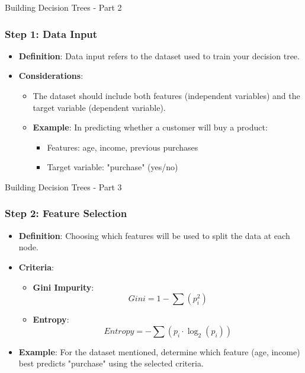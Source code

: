 \documentclass[aspectratio=169]{beamer}
\begin{document}
\begin{frame}[fragile]{Building Decision Trees - Part 2}
    \frametitle{Step 1: Data Input}
    \begin{itemize}
        \item \textbf{Definition}: Data input refers to the dataset used to train your decision tree.
        \item \textbf{Considerations}:
        \begin{itemize}
            \item The dataset should include both features (independent variables) and the target variable (dependent variable).
            \item \textbf{Example}: In predicting whether a customer will buy a product:
            \begin{itemize}
                \item Features: age, income, previous purchases
                \item Target variable: "purchase" (yes/no)
            \end{itemize}
        \end{itemize}
    \end{itemize}
\end{frame}

\begin{frame}[fragile]{Building Decision Trees - Part 3}
    \frametitle{Step 2: Feature Selection}
    \begin{itemize}
        \item \textbf{Definition}: Choosing which features will be used to split the data at each node.
        \item \textbf{Criteria}:
        \begin{itemize}
            \item \textbf{Gini Impurity}:
            \begin{equation}
                Gini = 1 - \sum (p_i^2)
            \end{equation}
            \item \textbf{Entropy}:
            \begin{equation}
                Entropy = - \sum (p_i \cdot \log_2(p_i))
            \end{equation}
        \end{itemize}
        \item \textbf{Example}: For the dataset mentioned, determine which feature (age, income) best predicts "purchase" using the selected criteria.
    \end{itemize}
\end{frame}
\end{document}
